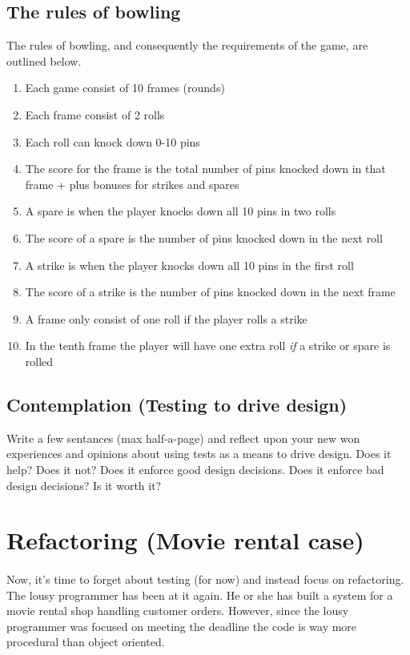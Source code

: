 \documentclass{article}
\begin{document}
    \subsection*{The rules of bowling}
    The rules of bowling, and consequently the requirements of the game, are outlined below.
      \begin{enumerate}
        \item Each game consist of 10 frames (rounds)
        \item Each frame consist of 2 rolls
        \item Each roll can knock down 0-10 pins
        \item The score for the frame is the total number of pins knocked down in that frame + plus bonuses for strikes and spares
        \item A spare is when the player knocks down all 10 pins in two rolls
        \item The score of a spare is the number of pins knocked down in the next roll
        \item A strike is when the player knocks down all 10 pins in the first roll
        \item The score of a strike is the number of pins knocked down in the next frame
        \item A frame only consist of one roll if the player rolls a strike
        \item In the tenth frame the player will have one extra roll \emph{if} a strike or spare is rolled
      \end{enumerate}

\subsection{ Contemplation (Testing to drive design) }
  Write a few sentances (max half-a-page) and reflect upon your new won experiences and opinions about using tests as a means to drive design. Does it help? Does it not? Does it enforce good design decisions. Does it enforce bad design decisions? Is it worth it?







\pagebreak
\section{ Refactoring (Movie rental case) }
  \paragraph{}
  Now, it's time to forget about testing (for now) and instead focus on refactoring. The lousy programmer has been at it again. He or she has built a system for a movie rental shop handling customer orders. However, since the lousy programmer was focused on meeting the deadline the code is way more procedural than object oriented.
  
\end{document}

